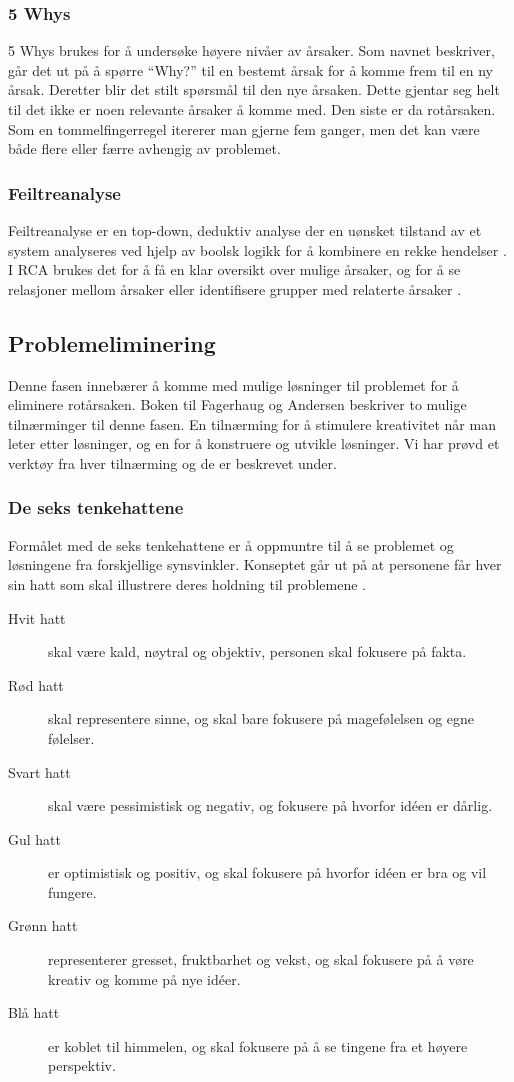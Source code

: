 \subsubsection{5 Whys}
5 Whys brukes for å undersøke høyere nivåer av årsaker. Som navnet beskriver, går det ut på å spørre ``Why?'' til en bestemt årsak for å komme frem til en ny årsak. Deretter blir det stilt spørsmål til den nye årsaken. Dette gjentar seg helt til det ikke er noen relevante årsaker å komme med. Den siste er da rotårsaken. Som en tommelfingerregel itererer man gjerne fem ganger, men det kan være både flere eller færre avhengig av problemet. 

\subsubsection{Feiltreanalyse}
Feiltreanalyse er en top-down, deduktiv analyse der en uønsket tilstand av et system analyseres ved hjelp av boolsk logikk for å kombinere en rekke hendelser \cite{wiki:faulttree}. I RCA brukes det for å få en klar oversikt over mulige årsaker, og for å se relasjoner mellom årsaker eller identifisere grupper med relaterte årsaker \cite{RCA}. 

\subsection{Problemeliminering}
Denne fasen innebærer å komme med mulige løsninger til problemet for å eliminere rotårsaken. Boken til Fagerhaug og Andersen \cite{RCA} beskriver to mulige tilnærminger til denne fasen. En tilnærming for å stimulere kreativitet når man leter etter løsninger, og en for å konstruere og utvikle løsninger. Vi har prøvd et verktøy fra hver tilnærming og de er beskrevet under. 

\subsubsection{De seks tenkehattene}
Formålet med de seks tenkehattene er å oppmuntre til å se problemet og løsningene fra forskjellige synsvinkler. Konseptet går ut på at personene får hver sin hatt som skal illustrere deres holdning til problemene \cite{RCA}. 

\begin{description}
    \item[Hvit hatt] skal være kald, nøytral og objektiv, personen skal fokusere på fakta.
    \item[Rød hatt] skal representere sinne, og skal bare fokusere på magefølelsen og egne følelser.
    \item[Svart hatt] skal være pessimistisk og negativ, og fokusere på hvorfor idéen er dårlig.
    \item[Gul hatt] er optimistisk og positiv, og skal fokusere på hvorfor idéen er bra og vil fungere.
    \item[Grønn hatt] representerer gresset, fruktbarhet og vekst, og skal fokusere på å vøre kreativ og komme på nye idéer.
    \item[Blå hatt] er koblet til himmelen, og skal fokusere på å se tingene fra et høyere perspektiv.
\end{description}


